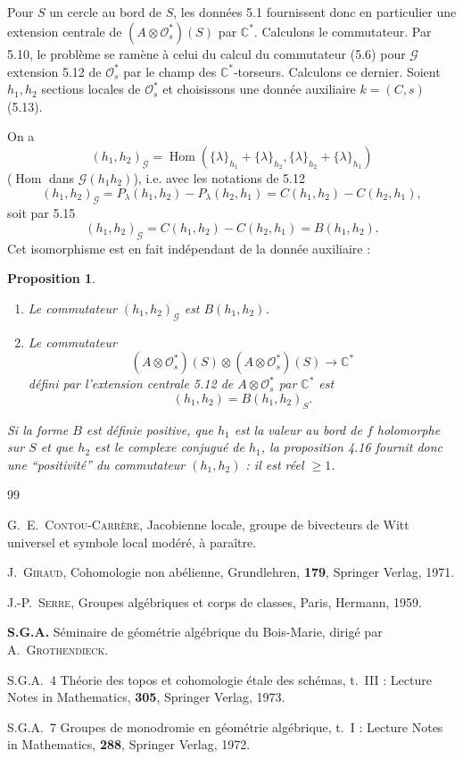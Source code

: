 \documentclass[12pt,a4paper]{article}
\theoremstyle{plain}
\newtheorem{proposition}[theorem]{Proposition}
\theoremstyle{definition}
\theoremstyle{remark}
\DeclareMathOperator{\Hom}{Hom}
\newcommand{\cO}{\mathcal{O}}
\newcommand{\C}{\mathbb{C}}
\providecommand{\cO}{\mathcal{O}}
\providecommand{\Hom}{\operatorname{Hom}}
\begin{document}
\subsection{}

Pour $S$ un cercle au bord de $S$, les données 5.1 fournissent donc en particulier
une extension centrale de $(A \otimes \cO_s^*)(S)$ par $\C^*$. Calculons le commutateur. Par 5.10,
le problème se ramène à celui du calcul du commutateur (5.6) pour $\mathscr{G}$ extension 5.12
de $\cO_s^*$ par le champ des $\C^*$-torseurs. Calculons ce dernier. Soient $h_1, h_2$ sections locales
de $\cO_s^*$ et choisissons une donnée auxiliaire $k = (C, s)$ (5.13).

On a
\[
(h_1, h_2)_\mathscr{G} = \Hom(\{\lambda\}_{h_1} + \{\lambda\}_{h_2}, \{\lambda\}_{h_2} + \{\lambda\}_{h_1})
\]
($\Hom$ dans $\mathscr{G}(h_1 h_2)$), i.e. avec les notations de 5.12
\[
(h_1, h_2)_\mathscr{G} = P_\lambda(h_1, h_2) - P_\lambda(h_2, h_1) = C(h_1, h_2) - C(h_2, h_1),
\]
soit par 5.15
\[
(h_1, h_2)_\mathscr{G} = C(h_1, h_2) - C(h_2, h_1) = B(h_1, h_2).
\]
Cet isomorphisme est en fait indépendant de la donnée auxiliaire :

\begin{proposition}
\begin{enumerate}[label=(\roman*)]
\item Le commutateur $(h_1, h_2)_\mathscr{G}$ est $B(h_1, h_2)$.
\item Le commutateur
\[
(A \otimes \cO_s^*)(S) \otimes (A \otimes \cO_s^*)(S) \to \C^*
\]
défini par l'extension centrale \emph{5.12} de $A \otimes \cO_s^*$ par $\C^*$ est
\[
(h_1, h_2) = B(h_1, h_2)_S.
\]
\end{enumerate}
Si la forme $B$ est définie positive, que $h_1$ est la valeur au bord de $f$ holomorphe
sur $S$ et que $h_2$ est le complexe conjugué de $h_1$, la proposition \emph{4.16} fournit donc une
``positivité'' du commutateur $(h_1, h_2)$ : il est réel $\geq 1$.
\end{proposition}

\begin{thebibliography}{99}

G.~E.~\textsc{Contou-Carrère}, Jacobienne locale, groupe de bivecteurs de Witt universel et symbole local modéré, à paraître.

J.~\textsc{Giraud}, Cohomologie non abélienne, Grundlehren, \textbf{179}, Springer Verlag, 1971.

J.-P.~\textsc{Serre}, Groupes algébriques et corps de classes, Paris, Hermann, 1959.

\textbf{S.G.A.} Séminaire de géométrie algébrique du Bois-Marie, dirigé par A.~\textsc{Grothendieck}.

\qquad S.G.A.~4 Théorie des topos et cohomologie étale des schémas, t.~III : Lecture Notes in Mathematics, \textbf{305}, Springer Verlag, 1973.

\qquad S.G.A.~7 Groupes de monodromie en géométrie algébrique, t.~I : Lecture Notes in Mathematics, \textbf{288}, Springer Verlag, 1972.

\end{thebibliography}
\end{document}
